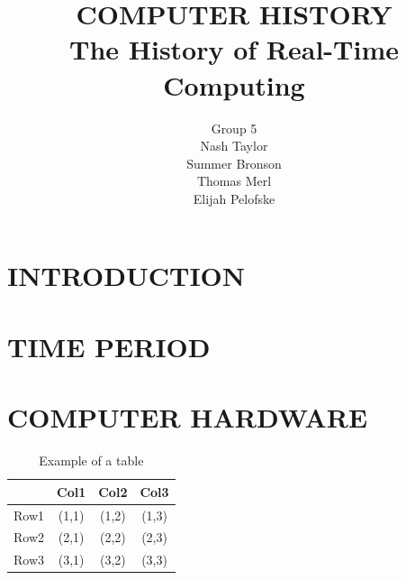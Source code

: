 \documentclass[letterpaper, 10 pt, conference]{IEEEconf}
\title{\LARGE \bf
COMPUTER HISTORY\\
\large The History of Real-Time Computing
}
\author{Group 5\\
\small Nash Taylor\\
\small Summer Bronson\\
\small Thomas Merl\\
\small Elijah Pelofske
}
\begin{document}
\maketitle
\thispagestyle{empty}
\pagestyle{empty}


\section{INTRODUCTION}

\section{TIME PERIOD}

\section{COMPUTER HARDWARE}

\begin{table}[h!]
\begin{center}
\begin{tabular}{||c | c | c | c||} 
\hline
  & Col1 & Col2 & Col3 \\ [0.5ex]
\hline\hline
Row1 & (1,1) & (1,2) & (1,3) \\ 
\hline
Row2 & (2,1) & (2,2) & (2,3) \\
\hline
Row3 & (3,1) & (3,2) & (3,3) \\
\hline
\end{tabular}
\caption{Example of a table}
\label{tbl:example}
\end{center}
\end{table}
\end{document}
